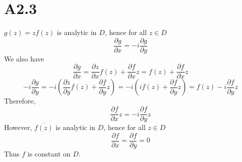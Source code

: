 \documentclass[11pt]{report}
\begin{document}
\section*{A2.3}
$g(z) = zf(z)$ is analytic in $D$, hence for all $z \in D$
\[
    \frac{\partial g}{\partial x} = -i \frac{\partial g}{\partial y}
\]
We also have
\[
    \frac{\partial g}{\partial x} = \frac{\partial z}{\partial x}f(z) + \frac{\partial f}{\partial x} z = f(z) + \frac{\partial f}{\partial x} z
\]
\[
    -i\frac{\partial g}{\partial y} = -i \left( \frac{\partial z}{\partial y}f(z) + \frac{\partial f}{\partial y}z \right) = -i \left(if(z) + \frac{\partial f}{\partial y}z\right) = f(z) - i\frac{\partial f}{\partial y}z
\]
Therefore,
\[
    \frac{\partial f}{\partial x} z = -i\frac{\partial f}{\partial y}z
\]
However, $\overline{f(z)}$ is analytic in $D$, hence for all $z \in D$
\[
    \frac{\partial f}{\partial x} = \frac{\partial f}{\partial y} = 0
\]
Thus $f$ is constant on $D$.
\newpage
\end{document}
